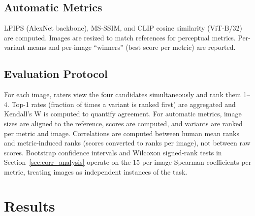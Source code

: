 \documentclass[conference]{IEEEtran}
\begin{document}
\subsection{Automatic Metrics}
LPIPS (AlexNet backbone), MS-SSIM, and CLIP cosine similarity (ViT-B/32) are computed. Images are resized to match references for perceptual metrics. Per-variant means and per-image ``winners'' (best score per metric) are reported.

\subsection{Evaluation Protocol}
For each image, raters view the four candidates simultaneously and rank them 1--4. Top-1 rates (fraction of times a variant is ranked first) are aggregated and Kendall's W is computed to quantify agreement. For automatic metrics, image sizes are aligned to the reference, scores are computed, and variants are ranked per metric and image. Correlations are computed between human mean ranks and metric-induced ranks (scores converted to ranks per image), not between raw scores. 
Bootstrap confidence intervals and Wilcoxon signed-rank tests in Section~\ref{sec:corr_analysis} operate on the 15 per-image Spearman coefficients per metric, treating images as
independent instances of the task.

\section{Results}
\label{sec:results}
\end{document}
